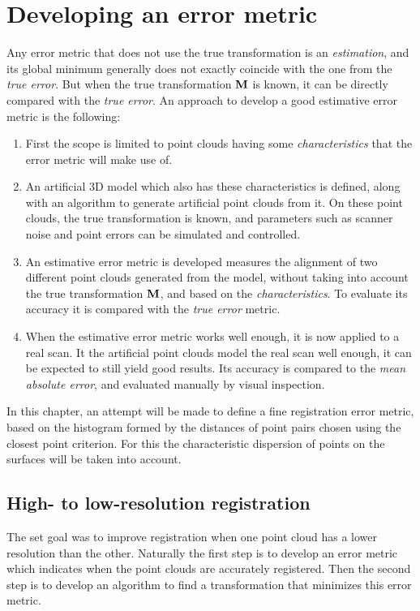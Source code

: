 \section{Developing an error metric}
Any error metric that does not use the true transformation is an \emph{estimation}, and its global minimum generally does not exactly coincide with the one from the \emph{true error}. But when the true transformation $\mathbf{M}$ is known, it can be directly compared with the \emph{true error}. An approach to develop a good estimative error metric is the following:
\begin{enumerate} 
\item First the scope is limited to point clouds having some \emph{characteristics} that the error metric will make use of.
\item An artificial 3D model which also has these characteristics is defined, along with an algorithm to generate artificial point clouds from it. On these point clouds, the true transformation is known, and parameters such as scanner noise and point errors can be simulated and controlled.
\item An estimative error metric is developed measures the alignment of two different point clouds generated from the model, without taking into account the true transformation $\mathbf{M}$, and based on the \emph{characteristics}. To evaluate its accuracy it is compared with the \emph{true error} metric.
\item When the estimative error metric works well enough, it is now applied to a real scan. It the artificial point clouds model the real scan well enough, it can be expected to still yield good results. Its accuracy is compared to the \emph{mean absolute error}, and evaluated manually by visual inspection.
\end{enumerate}

In this chapter, an attempt will be made to define a fine registration error metric, based on the histogram formed by the distances of point pairs chosen using the closest point criterion. For this the characteristic dispersion of points on the surfaces will be taken into account.

\subsection{High- to low-resolution registration}
The set goal was to improve registration when one point cloud has a lower resolution than the other. Naturally the first step is to develop an error metric which indicates when the point clouds are accurately registered. Then the second step is to develop an algorithm to find a transformation that minimizes this error metric.

